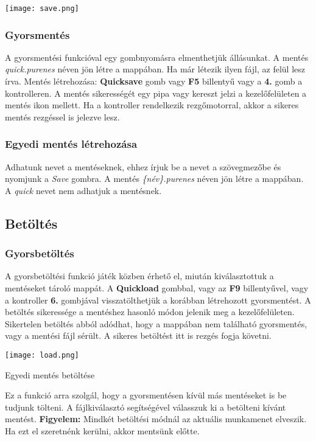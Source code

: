 \begin{center}
	\texttt{[image: save.png]}
\end{center}

\subsubsection{Gyorsmentés}

A gyorsmentési funkcióval egy gombnyomásra elmenthetjük állásunkat. A mentés \emph{quick.purenes} néven jön létre a mappában. Ha már létezik ilyen fájl, az felül lesz írva.
Mentés létrehozása: \textbf{Quicksave} gomb vagy \textbf{F5} billentyű vagy a \textbf{4.} gomb a kontrolleren.
A mentés sikerességét egy pipa vagy kereszt jelzi a kezelőfelületen a mentés ikon mellett.
Ha a kontroller rendelkezik rezgőmotorral, akkor a sikeres mentés rezgéssel is jelezve lesz.

\subsubsection{Egyedi mentés létrehozása}

Adhatunk nevet a mentéseknek, ehhez írjuk be a nevet a szövegmezőbe és nyomjunk a \emph{Save} gombra. A mentés \emph{\{név\}.purenes} néven jön létre a mappában. A \emph{quick} nevet nem adhatjuk a mentésnek.

\subsection{Betöltés}

\subsubsection{Gyorsbetöltés}

A gyorsbetöltési funkció játék közben érhető el, miután kiválasztottuk a mentéseket tároló mappát. A \textbf{Quickload} gombbal, vagy az \textbf{F9} billentyűvel, vagy a kontroller \textbf{6.} gombjával visszatölthetjük a korábban létrehozott gyorsmentést.
A betöltés sikeressége a mentéshez hasonló módon jelenik meg a kezelőfelületen.
Sikertelen betöltés abból adódhat, hogy a mappában nem található gyorsmentés, vagy a mentési fájl sérült.
A sikeres betöltést itt is rezgés fogja követni.

\begin{center}
	\texttt{[image: load.png]}
\end{center}


\begin{subsubsection}{Egyedi mentés betöltése}

Ez a funkció arra szolgál, hogy a gyorsmentésen kívül más mentéseket is be tudjunk tölteni. A fájlkiválasztó segítségével válasszuk ki a betölteni kívánt mentést. \newline \textbf{Figyelem:} Mindkét betöltési módnál az aktuális munkamenet elveszik. Ha ezt el szeretnénk kerülni, akkor mentsünk előtte.

\end{subsubsection}

